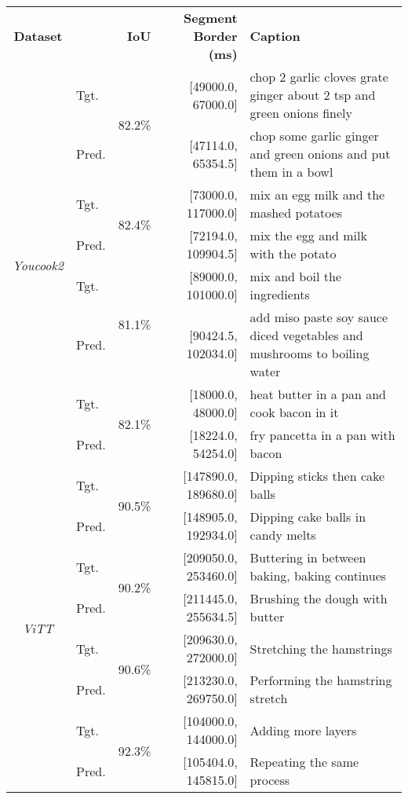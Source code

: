 \documentclass[11pt]{article}
\begin{document}
\begin{table*}[tbp]
\begin{adjustbox}{width=\linewidth,center}
\begin{tabular}{c l  r r l}
\cmidrule[\heavyrulewidth]{1-5}
\textbf{Dataset}    &   & \textbf{IoU}  & \textbf{Segment Border (ms)}  & \textbf{Caption} \\ 
\cmidrule[\heavyrulewidth]{1-5}
\multirow{8}{*}{\textit{Youcook2}}
    &   Tgt.    &	\multirow{2}{*}{82.2\%}  &   [49000.0, 67000.0]	&   chop 2 garlic cloves grate ginger about 2 tsp and green onions finely \\
    &   Pred.  &    &	[47114.0, 65354.5] &	chop some garlic ginger and green onions and put them in a bowl \\
\cmidrule{2-5}
    &   Tgt.  &   \multirow{2}{*}{82.4\%}  &   	[73000.0, 117000.0]	&   mix an egg milk and the mashed potatoes \\
    &   Pred. &     &	[72194.0, 109904.5]	&   mix the egg and milk with the potato \\
\cmidrule{2-5}
    &   Tgt.  &   \multirow{2}{*}{81.1\%}  &   	[89000.0, 101000.0]	&   mix and boil the ingredients \\
    &   Pred. &     & [90424.5, 102034.0]    &	add miso paste soy sauce diced vegetables and mushrooms to boiling water \\
\cmidrule{2-5}
    &   Tgt.  &   \multirow{2}{*}{82.1\%}  &   	[18000.0, 48000.0]  &	heat butter in a pan and cook bacon in it \\
    &   Pred. &     & [18224.0, 54254.0]    &	fry pancetta in a pan with bacon \\
\cmidrule[\heavyrulewidth]{1-5}

\multirow{8}{*}{\textit{ViTT}} 
    &   Tgt.  &   \multirow{2}{*}{90.5\%}  &  [147890.0, 189680.0]	 	&   Dipping sticks then cake balls \\
    &   Pred. &                     & [148905.0, 192934.0]	    &   Dipping cake balls in candy melts	 \\
\cmidrule{2-5}
    &   Tgt.  &   \multirow{2}{*}{90.2\%}  &   	[209050.0, 253460.0]	& Buttering in between baking, baking continues   \\
    &   Pred. &                     &  [211445.0, 255634.5]	   &    Brushing the dough with butter	 \\
\cmidrule{2-5}
    &   Tgt.  &   \multirow{2}{*}{90.6\%}  &   [209630.0, 272000.0]		&  Stretching the hamstrings  \\
    &   Pred. &                     &  [213230.0, 269750.0]	   &	 Performing the hamstring stretch \\
\cmidrule{2-5}
    &   Tgt.  &   \multirow{2}{*}{92.3\%}  &   [104000.0, 144000.0]			&  Adding more layers  \\
    &   Pred. &                     &   [105404.0, 145815.0]	  &	 Repeating the same process \\



\end{tabular}
\end{adjustbox}
\end{table*}
\end{document}

